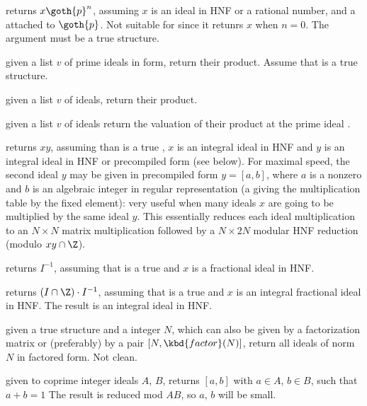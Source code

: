  returns $x
\goth{p}^{n}$, assuming $x$ is an ideal in HNF or a rational number, and
 a  attached to $\goth{p}$. Not suitable for
 since it retunrs $x$ when $n = 0$.
The  argument must be a true  structure.

 given a list $v$ of prime ideals
in  form, return their product. Assume that  is a true
 structure.

 given a list $v$ of ideals,
return their product.

 given a list $v$ of ideals
return the valuation of their product at the prime ideal .

 returns $xy$, assuming
than  is a true , $x$ is an integral ideal in HNF and $y$
is an integral ideal in HNF or precompiled form (see below).
For maximal speed, the second ideal $y$ may be given in precompiled form $y =
[a,b]$, where $a$ is a nonzero  and $b$ is an algebraic integer in
regular representation (a  giving the multiplication table by the
fixed element): very useful when many ideals $x$ are going to be multiplied by
the same ideal $y$. This essentially reduces each ideal multiplication to
an $N\times N$ matrix multiplication followed by a $N\times 2N$ modular
HNF reduction (modulo $xy\cap \Z$).

 returns $I^{-1}$, assuming that
 is a true  and $x$ is a fractional ideal in HNF.

 returns $(I\cap \Z) \cdot I^{-1}$,
assuming that  is a true  and $x$ is an integral fractional
ideal in HNF. The result is an integral ideal in HNF.

 given a true  structure and a
integer $N$, which can also be given by a factorization matrix or (preferably)
by a pair $[N, \kbd{factor}(N)]$, return all ideals of norm $N$ in factored
form. Not  clean.


 given to coprime integer ideals
$A$, $B$, returns $[a,b]$ with $a\in A$, $b\in B$, such that $a + b = 1$
The result is reduced mod $AB$, so $a$, $b$ will be small.

